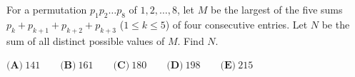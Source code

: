 For a permutation $p_1p_2\dots p_8$ of $1,2,\dots,8$, let $M$ be the largest of the five sums $p_k+p_{k+1}+p_{k+2}+p_{k+3}$ ($1\le k\le5$) of four consecutive entries. Let $N$ be the sum of all distinct possible values of $M$. Find $N$.

$\textbf{(A)}\ 141\qquad\textbf{(B)}\ 161\qquad\textbf{(C)}\ 180\qquad\textbf{(D)}\ 198\qquad\textbf{(E)}\ 215$
